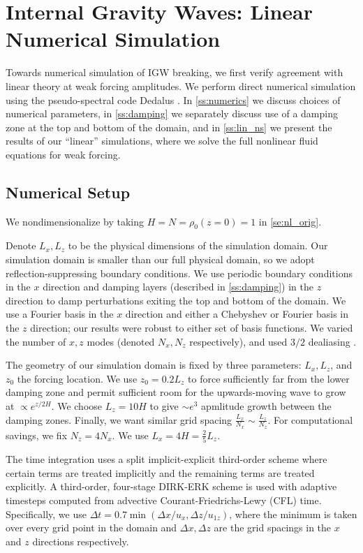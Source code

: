 \documentclass[
        fleqn,
        usenatbib,
    ]{mnras}
\begin{document}
\section{Internal Gravity Waves: Linear Numerical Simulation}\label{s:sim}

Towards numerical simulation of IGW breaking, we first verify agreement with
linear theory at weak forcing amplitudes. We perform direct numerical simulation
using the pseudo-spectral code Dedalus \citep{dedalus}. In \autoref{ss:numerics}
we discuss choices of numerical parameters, in \autoref{ss:damping} we
separately discuss use of a damping zone at the top and bottom of the domain,
and in \autoref{ss:lin_ns} we present the results of our ``linear'' simulations,
where we solve the full nonlinear fluid equations for weak forcing.

\subsection{Numerical Setup}\label{ss:numerics}

We nondimensionalize by taking $H = N = \rho_0(z=0) = 1$ in
\autoref{se:nl_orig}.

Denote $L_x, L_z$ to be the physical dimensions of the simulation domain. Our
simulation domain is smaller than our full physical domain, so we adopt
reflection-suppressing boundary conditions. We use periodic boundary conditions
in the $x$ direction and damping layers (described in \autoref{ss:damping}) in
the $z$ direction to damp perturbations exiting the top and bottom of the
domain. We use a Fourier basis in the $x$ direction and either a Chebyshev or
Fourier basis in the $z$ direction; our results were robust to either set of
basis functions. We varied the number of $x, z$ modes (denoted $N_x, N_z$
respectively), and used $3/2$ dealiasing \citep{boyd}.

The geometry of our simulation domain is fixed by three parameters: $L_x, L_z$,
and $z_0$ the forcing location. We use $z_0 = 0.2L_z$ to force sufficiently far
from the lower damping zone and permit sufficient room for the upwards-moving
wave to grow at $\propto e^{z/2H}$. We choose $L_z = 10H$ to give $\sim e^3$
apmlitude growth between the damping zones. Finally, we want similar grid
spacing $\frac{L_x}{N_x} \sim \frac{L_z}{N_z}$. For computational savings, we
fix $N_z = 4N_x$. We use $L_x = 4H = \frac{2}{5}L_z$.

The time integration uses a split implicit-explicit third-order scheme where
certain terms are treated implicitly and the remaining terms are treated
explicitly. A third-order, four-stage DIRK-ERK scheme \citep{ascher} is used
with adaptive timesteps computed from advective Courant-Friedrichs-Lewy (CFL)
time. Specifically, we use $\Delta t = 0.7 \min(\Delta x / u_x,\Delta z / u_{1z})$,
where the minimum is taken over every grid point in the domain and $\Delta
x,\Delta z$ are the grid spacings in the $x$ and $z$ directions respectively.
\end{document}
